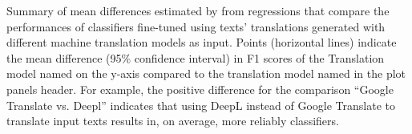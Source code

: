 Summary of mean differences estimated by from regressions that compare the  performances of classifiers fine-tuned using texts' translations generated with different machine translation models as input. Points (horizontal lines) indicate the mean difference (95\% confidence interval) in F1 scores of the Translation model named on the y-axis compared to the translation model named in the plot panels header. For example, the positive difference for the comparison ``Google Translate vs. Deepl'' indicates that using DeepL instead of Google Translate to translate input texts results in, on average, more reliably classifiers. \label{fig:pairwise_comparison_effects}
